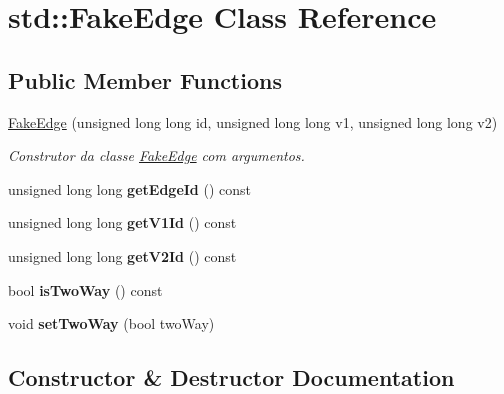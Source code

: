 \hypertarget{classstd_1_1_fake_edge}{}\section{std\+:\+:Fake\+Edge Class Reference}
\label{classstd_1_1_fake_edge}
\subsection*{Public Member Functions}
\begin{DoxyCompactItemize}
\item 
\hyperlink{classstd_1_1_fake_edge_abf77e55a537357f0aba59c7d71451559}{Fake\+Edge} (unsigned long long id, unsigned long long v1, unsigned long long v2)
\begin{DoxyCompactList}\small\item\em Construtor da classe \hyperlink{classstd_1_1_fake_edge}{Fake\+Edge} com argumentos. \end{DoxyCompactList}\item 
\hypertarget{classstd_1_1_fake_edge_af584bc07a0c1ea68b8474d25abe351ee}{}\label{classstd_1_1_fake_edge_af584bc07a0c1ea68b8474d25abe351ee} 
unsigned long long {\bfseries get\+Edge\+Id} () const
\item 
\hypertarget{classstd_1_1_fake_edge_a925930621074d67b495d6268c1ae30a6}{}\label{classstd_1_1_fake_edge_a925930621074d67b495d6268c1ae30a6} 
unsigned long long {\bfseries get\+V1\+Id} () const
\item 
\hypertarget{classstd_1_1_fake_edge_a104c42ff488cc4621b08cc5fd8096812}{}\label{classstd_1_1_fake_edge_a104c42ff488cc4621b08cc5fd8096812} 
unsigned long long {\bfseries get\+V2\+Id} () const
\item 
\hypertarget{classstd_1_1_fake_edge_ad583fb58336d078c99b9d6d88f8b4831}{}\label{classstd_1_1_fake_edge_ad583fb58336d078c99b9d6d88f8b4831} 
bool {\bfseries is\+Two\+Way} () const
\item 
\hypertarget{classstd_1_1_fake_edge_a3985d79972aa0b3d5d9362466242e968}{}\label{classstd_1_1_fake_edge_a3985d79972aa0b3d5d9362466242e968} 
void {\bfseries set\+Two\+Way} (bool two\+Way)
\end{DoxyCompactItemize}


\subsection{Constructor \& Destructor Documentation}
\hypertarget{classstd_1_1_fake_edge_abf77e55a537357f0aba59c7d71451559}{}\label{classstd_1_1_fake_edge_abf77e55a537357f0aba59c7d71451559} 
